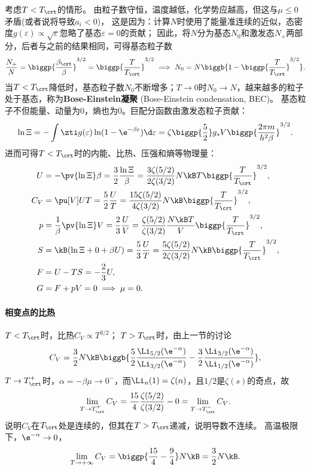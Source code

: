 考虑$T<T_\crt$的情形。
由粒子数守恒，温度越低，化学势应越高，但这与$\mu\leq 0$矛盾(或者说将导致$a_i<0$)，
这是因为：计算$N$时使用了能量准连续的近似，态密度$g(\varepsilon)\propto\sqrt\varepsilon$忽略了基态$\varepsilon=0$的贡献；
因此，将$N$分为基态$N_0$和激发态$N_+$两部分，后者与之前的结果相同，可得基态粒子数
\begin{equation}
	\frac{N_+}N=\biggp{\frac{\beta_\crt}\beta}^{3/2}=\biggp{\frac T{T_\crt}}^{3/2}
	\implies
	N_0=N\biggb{1-\biggp{\frac{T}{T_\crt}}^{3/2}}.
\end{equation}
当$T<T_\crt$降低时，基态粒子数$N_0$不断增多；$T\to 0$时$N_0\to N$，越来越多的粒子处于基态，称为\textbf{Bose-Einstein凝聚} (Bose-Einstein condensation, BEC)。
基态粒子不但能量、动量为0，熵也为0。巨配分函数由激发态粒子贡献：
\begin{equation}
	\ln\Xi=-\int\zti g(\varepsilon)\ln(1-\e^{-\beta\varepsilon})\d\varepsilon=\zeta\biggp{\frac52}g_sV\biggp{\frac{2\pi m}{h^2\beta}}^{3/2}.
\end{equation}
进而可得$T<T_\crt$时的内能、比热、压强和熵等物理量：
\begin{subequations}
	\begin{align}
		U&=-\pv{\ln\Xi}\beta=\frac32\frac{\ln\Xi}\beta=\frac{3\zeta(5/2)}{2\zeta(3/2)}N\kB T\biggp{\frac T{T_\crt}}^{3/2},\\
		C_V&=\pu[V]UT=\frac52\frac UT=\frac{15\zeta(5/2)}{4\zeta(3/2)}N\kB\biggp{\frac T{T_\crt}}^{3/2},\\
		p&=\frac1\beta\pv{\ln\Xi}V=\frac23\frac UV=\frac{\zeta(5/2)}{\zeta(3/2)}\frac{N\kB T}V\biggp{\frac T{T_\crt}}^{3/2},\\
		S&=\kB(\ln\Xi+0+\beta U)=\frac53\frac UT=\frac{5\zeta(5/2)}{2\zeta(3/2)}N\kB\biggp{\frac T{T_\crt}}^{3/2},\\
		F&=U-TS=-\frac23U,\\
		G&=F+pV=0\implies\mu=0.
	\end{align}
\end{subequations}

\paragraph{相变点的比热}
$T<T_\crt$时，比热$C_V\propto T^{3/2}$；
$T>T_\crt$时，由上一节的讨论
\[
	C_V=\frac32N\kB\biggb{\frac52\frac{\Li_{5/2}(\e^{-\alpha})}{\Li_{3/2}(\e^{-\alpha})}-\frac32\frac{\Li_{3/2}(\e^{-\alpha})}{\Li_{1/2}(\e^{-\alpha})}},
\]
$T\to T_\crt^+$时，$\alpha=-\beta\mu\to 0^-$，而$\Li_n(1)=\zeta(n)$，且$1/2$是$\zeta(s)$的奇点，故 
\[
	\lim_{T\to T_\crt^+}C_V=\frac{15}4\frac{\zeta(5/2)}{\zeta(3/2)}-0=\lim_{T\to T_\crt^-}C_V.
\]
说明$C_V$在$T_\crt$处是连续的，但其在$T>T_\crt$递减，说明导数不连续。
高温极限下，$\e^{-\alpha}\to0$，
\[
	\lim_{T\to+\infty}C_V=\biggp{\frac{15}4-\frac94}N\kB=\frac32N\kB.
\]


